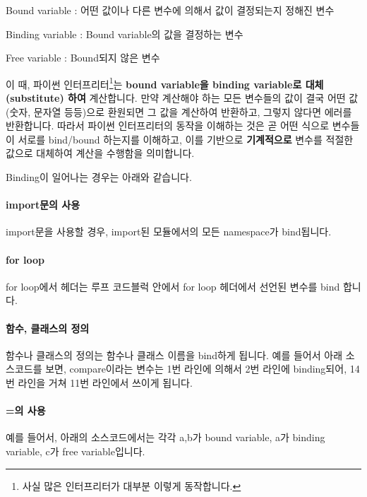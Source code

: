 \documentclass[twoside]{article}
\begin{document}
\begin{compactitem} 
\item Bound variable : 어떤 값이나 다른 변수에 의해서 값이 결정되는지 정해진 변수
\item Binding variable : Bound variable의 값을 결정하는 변수 
\item Free variable : Bound되지 않은 변수 
\end{compactitem}

이 때, 파이썬 인터프리터\footnote{사실 많은 인터프리터가 대부분 이렇게 동작합니다.}는 \textbf{bound variable을 binding variable로 대체(substitute) 하여} 계산합니다. 만약 계산해야 하는 모든 변수들의 값이 결국 어떤 값(숫자, 문자열 등등)으로 환원되면 그 값을 계산하여 반환하고, 그렇지 않다면 에러를 반환합니다. 따라서 파이썬 인터프리터의 동작을 이해하는 것은 곧 어떤 식으로 변수들이 서로를 bind/bound 하는지를 이해하고, 이를 기반으로 \textbf{기계적으로} 변수를 적절한 값으로 대체하여 계산을 수행함을 의미합니다. 

Binding이 일어나는 경우는 아래와 같습니다. 

\paragraph{import문의 사용} import문을 사용할 경우, import된 모듈에서의 모든 namespace가 bind됩니다. 

\paragraph{for loop} for loop에서 헤더는 루프 코드블럭 안에서 for loop 헤더에서 선언된 변수를 bind 합니다. 

\paragraph{함수, 클래스의 정의} 함수나 클래스의 정의는 함수나 클래스 이름을 bind하게 됩니다. 예를 들어서 아래 소스코드를 보면, compare이라는 변수는 1번 라인에 의해서 2번 라인에 binding되어, 14번 라인을 거쳐 11번 라인에서 쓰이게 됩니다. 




\paragraph{=의 사용} 

예를 들어서, 아래의 소스코드에서는 각각 a,b가 bound variable, a가 binding variable, c가 free variable입니다. 

\end{document}
